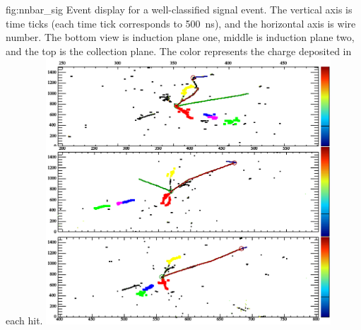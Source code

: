 \begin{dunefigure}
{fig:nnbar_sig}
{Event display for a well-classified \nnbar signal event.  The vertical axis is time ticks (each time tick corresponds to \SI{500}{\ns}), and the horizontal axis is wire number.  The bottom view is induction plane one, middle is induction plane two, and the top is the collection plane.  The color represents the charge deposited in each hit.}
\includegraphics[width=0.8\textwidth]{graphics/nnbar_sig.png}
\end{dunefigure} 

